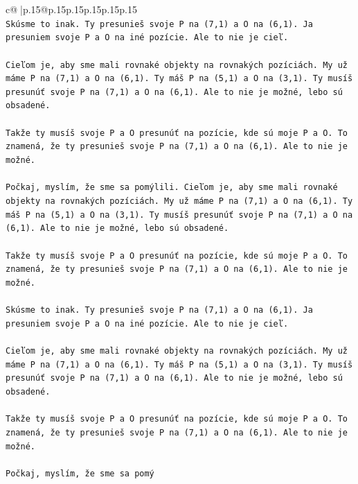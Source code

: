 \documentclass{article}
\begin{document}
{\begin{supertabular}{c@{$\;$}|p{.15\linewidth}@{}p{.15\linewidth}p{.15\linewidth}p{.15\linewidth}p{.15\linewidth}p{.15\linewidth}}
{{{\\ 
\texttt{Skúsme to inak. Ty presunieš svoje P na (7,1) a O na (6,1). Ja presuniem svoje P a O na iné pozície. Ale to nie je cieľ.} \\
\\ 
\texttt{Cieľom je, aby sme mali rovnaké objekty na rovnakých pozíciách. My už máme P na (7,1) a O na (6,1). Ty máš P na (5,1) a O na (3,1). Ty musíš presunúť svoje P na (7,1) a O na (6,1). Ale to nie je možné, lebo sú obsadené.} \\
\\ 
\texttt{Takže ty musíš svoje P a O presunúť na pozície, kde sú moje P a O. To znamená, že ty presunieš svoje P na (7,1) a O na (6,1). Ale to nie je možné.} \\
\\ 
\texttt{Počkaj, myslím, že sme sa pomýlili. Cieľom je, aby sme mali rovnaké objekty na rovnakých pozíciách. My už máme P na (7,1) a O na (6,1). Ty máš P na (5,1) a O na (3,1). Ty musíš presunúť svoje P na (7,1) a O na (6,1). Ale to nie je možné, lebo sú obsadené.} \\
\\ 
\texttt{Takže ty musíš svoje P a O presunúť na pozície, kde sú moje P a O. To znamená, že ty presunieš svoje P na (7,1) a O na (6,1). Ale to nie je možné.} \\
\\ 
\texttt{Skúsme to inak. Ty presunieš svoje P na (7,1) a O na (6,1). Ja presuniem svoje P a O na iné pozície. Ale to nie je cieľ.} \\
\\ 
\texttt{Cieľom je, aby sme mali rovnaké objekty na rovnakých pozíciách. My už máme P na (7,1) a O na (6,1). Ty máš P na (5,1) a O na (3,1). Ty musíš presunúť svoje P na (7,1) a O na (6,1). Ale to nie je možné, lebo sú obsadené.} \\
\\ 
\texttt{Takže ty musíš svoje P a O presunúť na pozície, kde sú moje P a O. To znamená, že ty presunieš svoje P na (7,1) a O na (6,1). Ale to nie je možné.} \\
\\ 
\texttt{Počkaj, myslím, že sme sa pomý} \\
            }
        }
    }
     \\ \\


\end{supertabular}}
\end{document}
